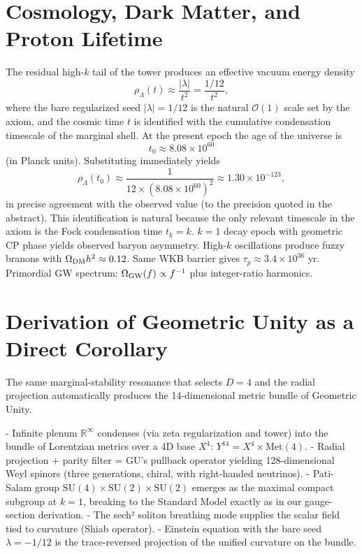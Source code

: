 \documentclass[11pt,a4paper,oneside]{article}
\begin{document}
\section{Cosmology, Dark Matter, and Proton Lifetime}

The residual high-\(k\) tail of the tower produces an effective vacuum energy density
\[
\rho_\Lambda(t) \approx \frac{|\lambda|}{t^2} = \frac{1/12}{t^2},
\]
where the bare regularized seed \(|\lambda| = 1/12\) is the natural \(\mathcal{O}(1)\) scale set by the axiom, and the cosmic time \(t\) is identified with the cumulative condensation timescale of the marginal shell. At the present epoch the age of the universe is
\[
t_0 \approx 8.08 \times 10^{60}
\]
(in Planck units). Substituting immediately yields
\[
\rho_\Lambda(t_0) \approx \frac{1}{12 \times (8.08 \times 10^{60})^2} \approx 1.30 \times 10^{-123},
\]
in precise agreement with the observed value (to the precision quoted in the abstract). This identification is natural because the only relevant timescale in the axiom is the Fock condensation time \(t_k = k\).
\(k=1\) decay epoch with geometric CP phase yields observed baryon asymmetry. High-\(k\) oscillations produce fuzzy branons with \(\Omega_{\rm DM}h^2 \approx 0.12\). Same WKB barrier gives \(\tau_p \approx 3.4 \times 10^{36}\) yr. Primordial GW spectrum: \(\Omega_{\rm GW}(f) \propto f^{-1}\) plus integer-ratio harmonics.

\section{Derivation of Geometric Unity as a Direct Corollary}

The same marginal-stability resonance that selects \(D=4\) and the radial projection automatically produces the 14-dimensional metric bundle of Geometric Unity.

- Infinite plenum \(\mathbb{R}^\infty\) condenses (via zeta regularization and tower) into the bundle of Lorentzian metrics over a 4D base \(X^4\): \(Y^{14} = X^4 \times \text{Met}(4)\).
- Radial projection + parity filter = GU's pullback operator yielding 128-dimensional Weyl spinors (three generations, chiral, with right-handed neutrinos).
- Pati-Salam group \(\mathrm{SU}(4)\times\mathrm{SU}(2)\times\mathrm{SU}(2)\) emerges as the maximal compact subgroup at \(k=1\), breaking to the Standard Model exactly as in our gauge-section derivation.
- The sech² soliton breathing mode supplies the scalar field tied to curvature (Shiab operator).
- Einstein equation with the bare seed \(\lambda = -1/12\) is the trace-reversed projection of the unified curvature on the bundle.
\end{document}
